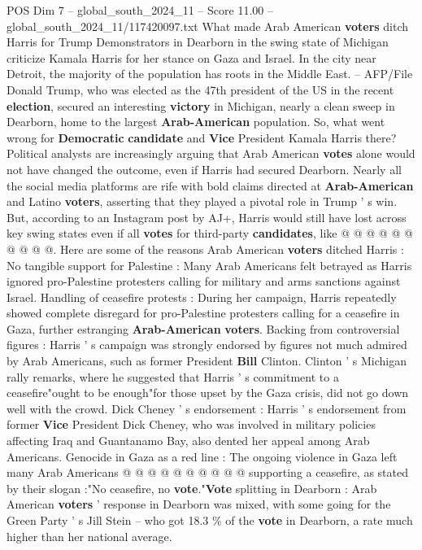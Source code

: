 \begin{textsample}{POS Dim 7 – global\_south\_2024\_11 – Score 11.00 – global\_south\_2024\_11/117420097.txt}  \label{ex:f7_pos_139}
What made Arab American \textbf{voters} ditch Harris for Trump Demonstrators in Dearborn in the swing state of Michigan criticize Kamala Harris for her stance on Gaza and Israel.
In the city near Detroit, the majority of the population has roots in the Middle East. -- AFP/File Donald Trump, who was elected as the 47th president of the US in the recent \textbf{election}, secured an interesting \textbf{victory} in Michigan, nearly a clean sweep in Dearborn, home to the largest \textbf{Arab-American} population.
So, what went wrong for \textbf{Democratic} \textbf{candidate} and \textbf{Vice} President Kamala Harris there?
Political analysts are increasingly arguing that Arab American \textbf{votes} alone would not have changed the outcome, even if Harris had secured Dearborn.
Nearly all the social media platforms are rife with bold claims directed at \textbf{Arab-American} and Latino \textbf{voters}, asserting that they played a pivotal role in Trump ' s win.
But, according to an Instagram post by AJ+, Harris would still have lost across key swing states even if all \textbf{votes} for third-party \textbf{candidates}, like @ @ @ @ @ @ @ @ @ @.
Here are some of the reasons Arab American \textbf{voters} ditched Harris : No tangible support for Palestine : Many Arab Americans felt betrayed as Harris ignored pro-Palestine protesters calling for military and arms sanctions against Israel.
Handling of ceasefire protests : During her campaign, Harris repeatedly showed complete disregard for pro-Palestine protesters calling for a ceasefire in Gaza, further estranging \textbf{Arab-American} \textbf{voters}.
Backing from controversial figures : Harris ' s campaign was strongly endorsed by figures not much admired by Arab Americans, such as former President \textbf{Bill} Clinton.
Clinton ' s Michigan rally remarks, where he suggested that Harris ' s commitment to a ceasefire"ought to be enough"for those upset by the Gaza crisis, did not go down well with the crowd.
Dick Cheney ' s endorsement : Harris ' s endorsement from former \textbf{Vice} President Dick Cheney, who was involved in military policies affecting Iraq and Guantanamo Bay, also dented her appeal among Arab Americans.
Genocide in Gaza as a red line : The ongoing violence in Gaza left many Arab Americans @ @ @ @ @ @ @ @ @ @ supporting a ceasefire, as stated by their slogan :"No ceasefire, no \textbf{vote}."\textbf{Vote} splitting in Dearborn : Arab American \textbf{voters} ' response in Dearborn was mixed, with some going for the Green Party ' s Jill Stein -- who got 18.3 \% of the \textbf{vote} in Dearborn, a rate much higher than her national average.

\end{textsample}
